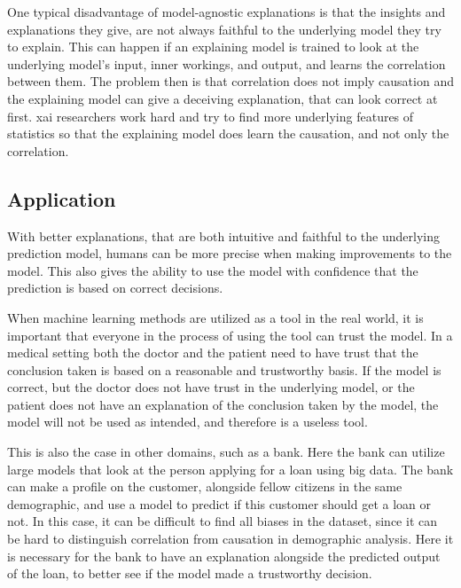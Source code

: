 One typical disadvantage of model-agnostic explanations is that the insights and explanations they give, are not always faithful to the underlying model they try to explain. This can happen if an explaining model is trained to look at the underlying model's input, inner workings, and output, and learns the correlation between them. The problem then is that correlation does not imply causation and the explaining model can give a deceiving explanation, that can look correct at first. \gls{xai} researchers work hard and try to find more underlying features of statistics so that the explaining model does learn the causation, and not only the correlation.




\subsection{Application}

With better explanations, that are both intuitive and faithful to the underlying prediction model, humans can be more precise when making improvements to the model. This also gives the ability to use the model with confidence that the prediction is based on correct decisions.


When machine learning methods are utilized as a tool in the real world, it is important that everyone in the process of using the tool can trust the model. 
In a medical setting both the doctor and the patient need to have trust that the conclusion taken is based on a reasonable and trustworthy basis. If the model is correct, but the doctor does not have trust in the underlying model, or the patient does not have an explanation of the conclusion taken by the model, the model will not be used as intended, and therefore is a useless tool. 

This is also the case in other domains, such as a bank. Here the bank can utilize large models that look at the person applying for a loan using big data. The bank can make a profile on the customer, alongside fellow citizens in the same demographic, and use a model to predict if this customer should get a loan or not. In this case, it can be difficult to find all biases in the dataset, since it can be hard to distinguish correlation from causation in demographic analysis. Here it is necessary for the bank to have an explanation alongside the predicted output of the loan, to better see if the model made a trustworthy decision. 

